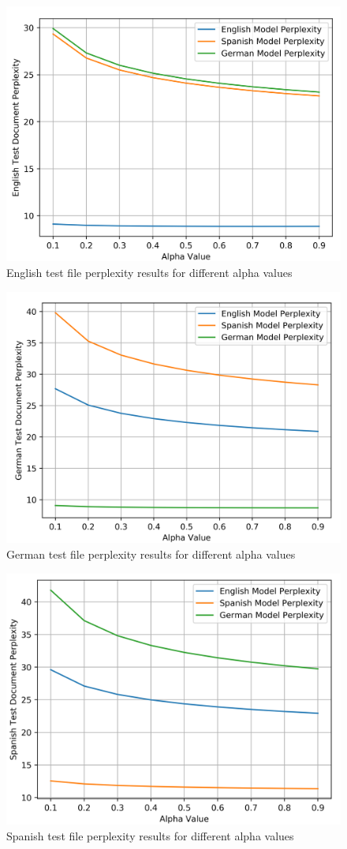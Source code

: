\documentclass[12pt]{article}
\begin{document}
\begin{figure}[H]
	\centering
	\includegraphics[width=0.7\linewidth]{graphics/alpha_changes_English}
	\caption{English test file perplexity results for different alpha values}
	\label{fig:alphachanges_english}
\end{figure}
\begin{figure}[H]
	\centering
	\includegraphics[width=0.7\linewidth]{graphics/alpha_changes_German}
	\caption{German test file perplexity results for different alpha values}
	\label{fig:alphachanges_german}
\end{figure}
\begin{figure}[H]
	\centering
	\includegraphics[width=0.7\linewidth]{graphics/alpha_changes_Span}
	\caption{Spanish test file perplexity results for different alpha values}
	\label{fig:alphachanges_spanish}
\end{figure}
\end{document}
